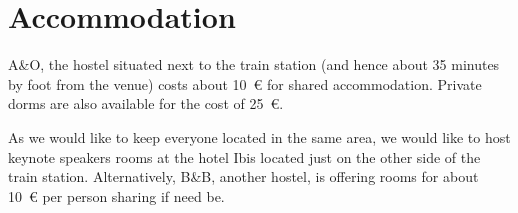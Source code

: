 

\section{Accommodation}

A\&O, the hostel situated next to the train station (and hence about 35 minutes by foot from the venue) costs about \SI{10}{\euro} for shared accommodation. Private dorms are also available for the cost of \SI{25}{\euro}. 

As we would like to keep everyone located in the same area, we would like to host keynote speakers rooms at the hotel Ibis located just on the other side of the train station. 
Alternatively, B\&B, another hostel, is offering rooms for about \SI{10}{\euro} per person sharing if need be. 


\newpage
